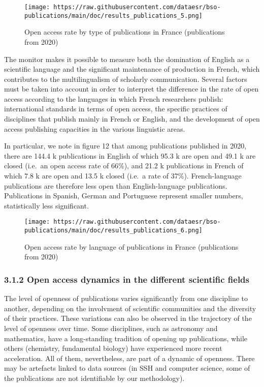 \documentclass[
]{article}
\begin{document}
\begin{figure}
\centering
\texttt{[image: https://raw.githubusercontent.com/dataesr/bso-publications/main/doc/results\_publications\_5.png]}
\caption{Open access rate by type of publications in France
(publications from 2020)}
\end{figure}

The monitor makes it possible to measure both the domination of English
as a scientific language and the significant maintenance of production
in French, which contributes to the multilingualism of scholarly
communication. Several factors must be taken into account in order to
interpret the difference in the rate of open access according to the
languages in which French researchers publish: international standards
in terms of open access, the specific practices of disciplines that
publish mainly in French or English, and the development of open access
publishing capacities in the various linguistic areas.

In particular, we note in figure 12 that among publications published in
2020, there are 144.4 k publications in English of which 95.3 k are open
and 49.1 k are closed (i.e.~an open access rate of 66\%), and 21.2 k
publications in French of which 7.8 k are open and 13.5 k closed (i.e.~a
rate of 37\%). French-language publications are therefore less open than
English-language publications. Publications in Spanish, German and
Portuguese represent smaller numbers, statistically less significant.

\begin{figure}
\centering
\texttt{[image: https://raw.githubusercontent.com/dataesr/bso-publications/main/doc/results\_publications\_6.png]}
\caption{Open access rate by language of publications in France
(publications from 2020)}
\end{figure}

\hypertarget{open-access-dynamics-in-the-different-scientific-fields}{%
\subsubsection{3.1.2 Open access dynamics in the different scientific
fields}\label{open-access-dynamics-in-the-different-scientific-fields}}

The level of openness of publications varies significantly from one
discipline to another, depending on the involvment of scientific
communities and the diversity of their practices. These variations can
also be observed in the trajectory of the level of openness over time.
Some disciplines, such as astronomy and mathematics, have a
long-standing tradition of opening up publications, while others
(chemistry, fundamental biology) have experienced more recent
acceleration. All of them, nevertheless, are part of a dynamic of
openness. There may be artefacts linked to data sources (in SSH and
computer science, some of the publications are not identifiable by our
methodology).
\end{document}
